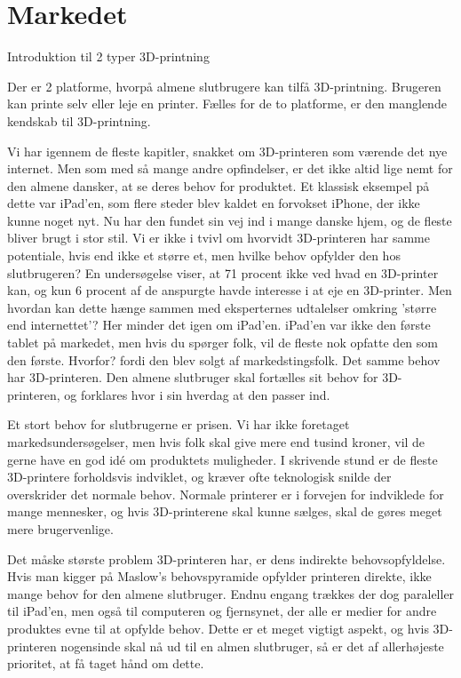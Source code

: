 \section{Markedet} %

Introduktion til 2 typer 3D-printning

Der er 2 platforme, hvorpå almene slutbrugere kan tilfå 3D-printning. Brugeren kan printe selv eller leje en printer. Fælles for de to platforme, er den manglende kendskab til 3D-printning.





Vi har igennem de fleste kapitler, snakket om 3D-printeren som værende det nye internet. Men som med så mange andre opfindelser, er det ikke altid lige nemt for den almene dansker, at se deres behov for produktet. Et klassisk eksempel på dette var iPad'en, som flere steder blev kaldet en forvokset iPhone, der ikke kunne noget nyt. Nu har den fundet sin vej ind i mange danske hjem, og de fleste bliver brugt i stor stil. 
Vi er ikke i tvivl om hvorvidt 3D-printeren har samme potentiale, hvis end ikke et større et, men hvilke behov opfylder den hos slutbrugeren? En undersøgelse viser, at 71 procent ikke ved hvad en 3D-printer kan, og kun 6 procent af de anspurgte havde interesse i at eje en 3D-printer.
Men hvordan kan dette hænge sammen med eksperternes udtalelser omkring 'større end internettet'? \autocite{financial_times_3d_2012} Her minder det igen om iPad'en. iPad'en var ikke den første tablet på markedet, men hvis du spørger folk, vil de fleste nok opfatte den som den første. Hvorfor? fordi den blev solgt af markedstingsfolk. Det samme behov har 3D-printeren. Den almene slutbruger skal fortælles sit behov for 3D-printeren, og forklares hvor i sin hverdag at den passer ind.

Et stort behov for slutbrugerne er prisen. Vi har ikke foretaget markedsundersøgelser, men hvis folk skal give mere end tusind kroner, vil de gerne have en god idé om produktets muligheder. I skrivende stund er de fleste 3D-printere forholdsvis indviklet, og kræver ofte teknologisk snilde der overskrider det normale behov. Normale printerer er i forvejen for indviklede for mange mennesker, og hvis 3D-printerene skal kunne sælges, skal de gøres meget mere brugervenlige.

Det måske største problem 3D-printeren har, er dens indirekte behovsopfyldelse. Hvis man kigger på Maslow's behovspyramide \autocite{abraham_harold_maslow_theory_1943} opfylder printeren direkte, ikke mange behov for den almene slutbruger. Endnu engang trækkes der dog paraleller til iPad'en, men også til computeren og fjernsynet, der alle er medier for andre produktes evne til at opfylde behov. Dette er et meget vigtigt aspekt, og hvis 3D-printeren nogensinde skal nå ud til en almen slutbruger, så er det af allerhøjeste prioritet, at få taget hånd om dette.




